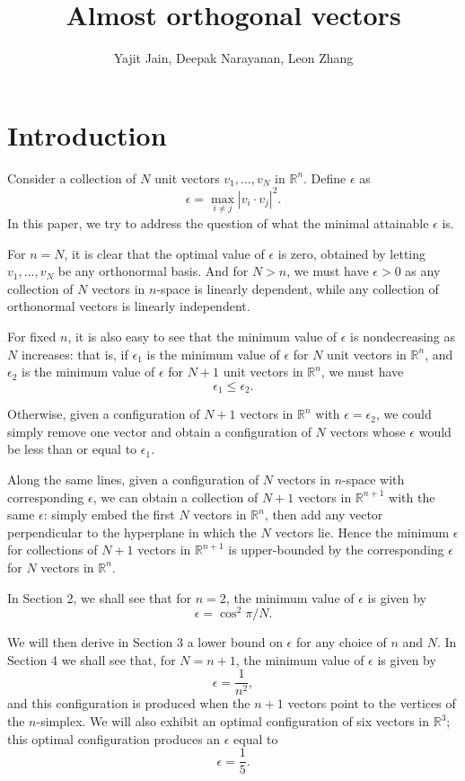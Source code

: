 \documentclass[11pt,letterpaper,twoside,english]{article}
\title{Almost orthogonal vectors}
\author{Yajit Jain, Deepak Narayanan, Leon Zhang}
\theoremstyle{theorem}
\theoremstyle{remark}
\begin{document}
\maketitle

\section{Introduction}
Consider a collection of $N$ unit vectors $v_1, \ldots, v_N$ in $\mathbb R^n$. Define $\epsilon$ as
\[\epsilon=\max_{i\neq j}|v_i\cdot v_j|^2.\]
In this paper, we try to address the question of what the minimal attainable $\epsilon$ is.

For $n=N$, it is clear that the optimal value of $\epsilon$ is zero, obtained by letting $v_1,\ldots, v_N$ be any orthonormal basis. And for $N>n$, we must have $\epsilon>0$ as any collection of $N$ vectors in $n$-space is linearly dependent, while any collection of orthonormal vectors is linearly independent. 

For fixed $n$, it is also easy to see that the minimum value of $\epsilon$ is nondecreasing as $N$ increases: that is, if $\epsilon_1$ is the minimum value of $\epsilon$ for $N$ unit vectors in $\mathbb R^n$, and $\epsilon_2$ is the minimum value of $\epsilon$ for $N+1$ unit vectors in $\mathbb R^n$, we must have 
\[\epsilon_1\leq \epsilon_2.\] 

Otherwise, given a configuration of $N+1$ vectors in $\mathbb R^n$ with $\epsilon=\epsilon_2$, we could simply remove one vector and obtain a configuration of $N$ vectors whose $\epsilon$ would be less than or equal to $\epsilon_1$.

Along the same lines, given a configuration of $N$ vectors in $n$-space with corresponding $\epsilon$, we can obtain a collection of $N+1$ vectors in $\mathbb R^{n+1}$ with the same $\epsilon$: simply embed the first $N$ vectors in $\mathbb R^{n}$, then add any vector perpendicular to the hyperplane in which the $N$ vectors lie. Hence the minimum $\epsilon$ for collections of $N+1$ vectors in $\mathbb R^{n+1}$ is upper-bounded by the corresponding $\epsilon$ for $N$ vectors in $\mathbb R^n$.

In Section 2, we shall see that for $n=2$, the minimum value of $\epsilon$ is given by 
\[\epsilon=\cos^2\pi/N.\] 

We will then derive in Section 3 a lower bound on $\epsilon$ for any choice of $n$ and $N$. In Section 4 we shall see that, for $N=n+1$, the minimum value of $\epsilon$ is given by
\[\epsilon=\frac{1}{n^2},\] 
and this configuration is produced when the $n+1$ vectors point to the vertices of the $n$-simplex. We will also exhibit an optimal configuration of six vectors in $\mathbb R^3$; this optimal configuration produces an $\epsilon$ equal to
\[\epsilon=\frac 1 5.\]
\end{document}
